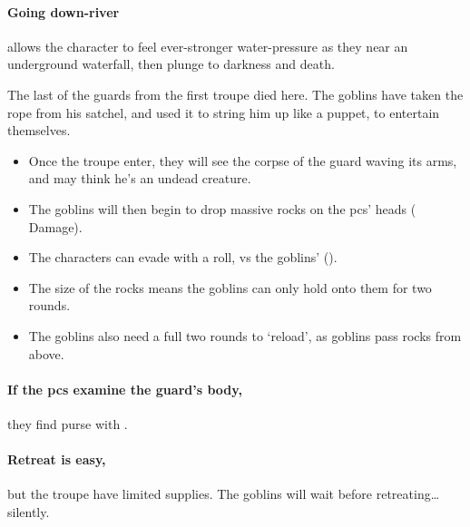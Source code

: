 \begin{multicols}{2}

\paragraph{Going down-river}
allows the character to feel ever-stronger water-pressure as they near an underground waterfall, then plunge to darkness and death.



\begin{exampletext}
  The last of the \glspl{guard} from the first troupe died here.
  The goblins have taken the rope from his satchel, and used it to string him up like a puppet, to entertain themselves.
\end{exampletext}

\begin{itemize}
  \item
  Once the troupe enter, they will see the corpse of the \gls{guard} waving its arms, and may think he's an undead creature.
  \item
  The goblins will then begin to drop massive rocks on the \glspl{pc}' heads ( Damage).
  \item
  The characters can evade with a  roll, vs the goblins'  (\tn).
  \item
  The size of the rocks means the goblins can only hold onto them for two \glspl{round}.
  \item
  The goblins also need a full two rounds to `reload', as goblins pass rocks from above.
\end{itemize}

\paragraph{If the \glspl{pc} examine the \gls{guard}'s body,}
they find  purse with \lootMedium.
\label{caveCoinsIII}
\setcounter{diceNo}{0}%
\renewcommand\npcsymbol{\currency}

\paragraph{Retreat is easy,}
but the troupe have limited supplies.
The goblins will wait  before retreating\ldots silently.


\end{multicols}
